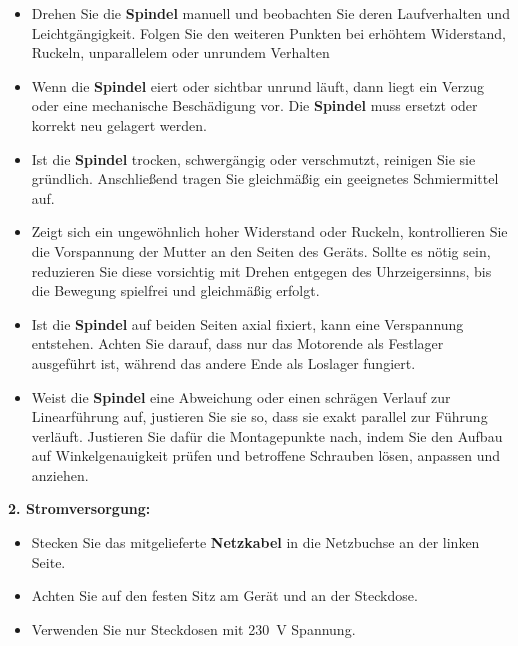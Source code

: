 \documentclass[a4paper,12pt,final]{report}
\begin{document}
	    \begin{itemize}[leftmargin=1.5em]
		
		\item Drehen Sie die \textbf{Spindel} manuell und beobachten Sie deren Laufverhalten und Leichtgängigkeit. Folgen Sie den weiteren Punkten bei erhöhtem Widerstand, Ruckeln, unparallelem oder unrundem Verhalten 
		
		\item Wenn die \textbf{Spindel} eiert oder sichtbar unrund läuft, dann liegt ein Verzug oder eine mechanische Beschädigung vor. Die \textbf{Spindel} muss ersetzt oder korrekt neu gelagert werden.
		
		\item Ist die \textbf{Spindel} trocken, schwergängig oder verschmutzt, reinigen Sie sie gründlich. Anschließend tragen Sie gleichmäßig ein geeignetes Schmiermittel auf. 
		
		\item Zeigt sich ein ungewöhnlich hoher Widerstand oder Ruckeln, kontrollieren Sie die Vorspannung der Mutter an den Seiten des Geräts. Sollte es nötig sein, reduzieren Sie diese vorsichtig mit Drehen entgegen des Uhrzeigersinns, bis die Bewegung spielfrei und gleichmäßig erfolgt. 
		
		\item Ist die \textbf{Spindel} auf beiden Seiten axial fixiert, kann eine Verspannung entstehen. Achten Sie darauf, dass nur das Motorende als Festlager ausgeführt ist, während das andere Ende als Loslager fungiert.
		
		\item Weist die \textbf{Spindel} eine Abweichung oder einen schrägen Verlauf zur Linearführung auf, justieren Sie sie so, dass sie exakt parallel zur Führung verläuft. Justieren Sie dafür die Montagepunkte nach, indem Sie den Aufbau auf Winkelgenauigkeit prüfen und betroffene Schrauben lösen, anpassen und anziehen.\\ 
	    \end{itemize}
		
		
		\noindent\textbf{2. Stromversorgung:}
		
		\begin{itemize}[leftmargin=1.5em]
		
		\item Stecken Sie das mitgelieferte \textbf{Netzkabel} in die Netzbuchse an der linken Seite. 
		\item Achten Sie auf den festen Sitz am Gerät und an der Steckdose. 
		\item Verwenden Sie nur Steckdosen mit 230\ V Spannung. \\
    	\end{itemize}
		
\end{document}
